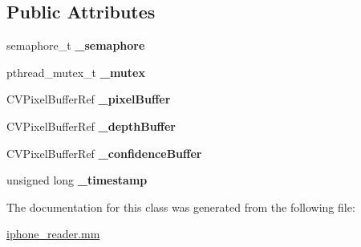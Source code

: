 \subsection*{Public Attributes}
\begin{DoxyCompactItemize}
\item 
\mbox{\label{interfaceSessionDelegate_a205af00df48affe44122884199a506ad}} 
semaphore\+\_\+t {\bfseries \+\_\+semaphore}
\item 
\mbox{\label{interfaceSessionDelegate_a80b6b669e67dc24266e00763029f3d97}} 
pthread\+\_\+mutex\+\_\+t {\bfseries \+\_\+mutex}
\item 
\mbox{\label{interfaceSessionDelegate_ace9e7115174ecd921998eedee3defb4c}} 
C\+V\+Pixel\+Buffer\+Ref {\bfseries \+\_\+pixel\+Buffer}
\item 
\mbox{\label{interfaceSessionDelegate_aad0cb30aed752a3ae50b17fc050fd214}} 
C\+V\+Pixel\+Buffer\+Ref {\bfseries \+\_\+depth\+Buffer}
\item 
\mbox{\label{interfaceSessionDelegate_aca054d8eb1089ed57cef8fd6e1555f8d}} 
C\+V\+Pixel\+Buffer\+Ref {\bfseries \+\_\+confidence\+Buffer}
\item 
\mbox{\label{interfaceSessionDelegate_a98e512d00bcac93d29618e6f2d6b9e36}} 
unsigned long {\bfseries \+\_\+timestamp}
\end{DoxyCompactItemize}


The documentation for this class was generated from the following file\+:\begin{DoxyCompactItemize}
\item 
\hyperlink{iphone__reader_8mm}{iphone\+\_\+reader.\+mm}\end{DoxyCompactItemize}
